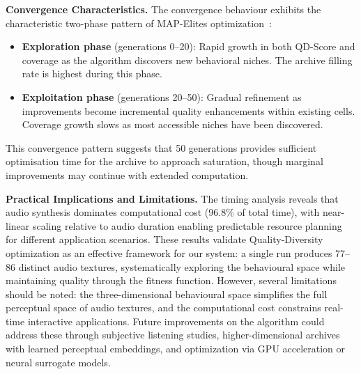 \textbf{Convergence Characteristics.}
The convergence behaviour exhibits the characteristic two-phase pattern of MAP-Elites optimization~\cite{mouret2015illuminating}:
\begin{itemize}
    \item \textbf{Exploration phase} (generations 0--20): Rapid growth in both QD-Score and coverage as the algorithm discovers new behavioral niches. The archive filling rate is highest during this phase.
    \item \textbf{Exploitation phase} (generations 20--50): Gradual refinement as improvements become incremental quality enhancements within existing cells. Coverage growth slows as most accessible niches have been discovered.
\end{itemize}

This convergence pattern suggests that 50 generations provides sufficient optimisation time for the archive to approach saturation, though marginal improvements may continue with extended computation.



\textbf{Practical Implications and Limitations.}
The timing analysis reveals that audio synthesis dominates computational cost (96.8\% of total time), with near-linear scaling relative to audio duration enabling predictable resource planning for different application scenarios. These results validate Quality-Diversity optimization as an effective framework for our system: a single run produces 77--86 distinct audio textures, systematically exploring the behavioural space while maintaining quality through the fitness function. However, several limitations should be noted: the three-dimensional behavioural space simplifies the full perceptual space of audio textures, and the computational cost constrains real-time interactive applications. Future improvements on the algorithm could address these through subjective listening studies, higher-dimensional archives with learned perceptual embeddings, and optimization via GPU acceleration or neural surrogate models.